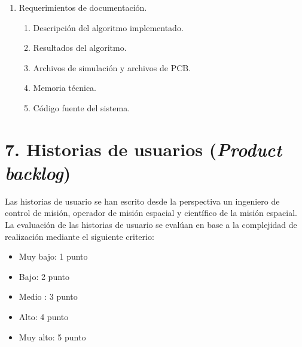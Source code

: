 \documentclass[
11pt, %
]{charter}
\begin{document}
\begin{enumerate}
\item Requerimientos de documentación.
	\begin{enumerate}
		\item Descripción del algoritmo implementado. 
		\item Resultados del algoritmo. 
		\item Archivos de simulación y archivos de PCB. 
		\item Memoria técnica.
		\item Código fuente del sistema. 
	\end{enumerate}
\end{enumerate}



\section{7. Historias de usuarios (\textit{Product backlog})}
\label{sec:backlog}
Las historias de usuario se han escrito desde la perspectiva un ingeniero de control de misión, operador de misión espacial y científico de la misión espacial. La evaluación de las historias de usuario se evalúan en base a la complejidad de realización mediante el siguiente criterio: 
\begin{itemize}
	\item Muy bajo: 1 punto 
	\item Bajo: 2 punto 
	\item Medio : 3 punto 
	\item Alto: 4 punto 
	\item Muy alto: 5 punto 
\end{itemize}
\end{document}
